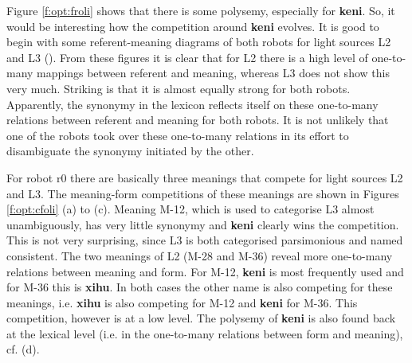 Figure \ref{f:opt:froli} shows that there is some polysemy, especially for {\bf keni}. So, it would be interesting how the competition around {\bf keni} evolves. It is good to begin with some referent-meaning diagrams of both robots for light sources L2 and L3 (). From these figures it is clear that for L2 there is a high level of one-to-many mappings between referent and meaning, whereas L3 does not show this very much. Striking is that it is almost equally strong for both robots. Apparently, the synonymy in the lexicon reflects itself on these one-to-many relations between referent and meaning for both robots. It is not unlikely that one of the robots took over these one-to-many relations in its effort to disambiguate the synonymy initiated by the other. 

For robot r0 there are basically three meanings that compete for light sources L2 and L3. The meaning-form competitions of these meanings are shown in Figures \ref{f:opt:cfoli} (a) to (c). Meaning M-12, which is used to categorise L3 almost unambiguously, has very little synonymy and {\bf keni} clearly wins the competition. This is not very surprising, since L3 is both categorised  parsimonious and named consistent. The two meanings of L2 (M-28 and M-36) reveal more one-to-many relations between meaning and form. For M-12, {\bf keni} is most frequently used and for M-36 this is {\bf xihu}. In both cases the other name is also competing for these meanings, i.e. {\bf xihu} is also competing for M-12 and {\bf keni} for M-36. This competition, however is at a low level. The polysemy of {\bf keni} is also found back at the lexical level (i.e. in the one-to-many relations between form and meaning), cf.  (d). 

